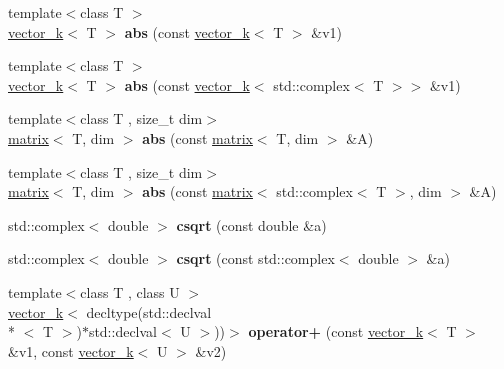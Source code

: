 \begin{DoxyCompactItemize}
\item 
\hypertarget{namespacekeycpp_a83cec179e95af014706ce54194efd1b9}{{\footnotesize template$<$class T $>$ }\\\hyperlink{classkeycpp_1_1vector__k}{vector\-\_\-k}$<$ T $>$ {\bfseries abs} (const \hyperlink{classkeycpp_1_1vector__k}{vector\-\_\-k}$<$ T $>$ \&v1)}\label{namespacekeycpp_a83cec179e95af014706ce54194efd1b9}

\item 
\hypertarget{namespacekeycpp_aa48f282087263edb46886e9390b9a833}{{\footnotesize template$<$class T $>$ }\\\hyperlink{classkeycpp_1_1vector__k}{vector\-\_\-k}$<$ T $>$ {\bfseries abs} (const \hyperlink{classkeycpp_1_1vector__k}{vector\-\_\-k}$<$ std\-::complex$<$ T $>$$>$ \&v1)}\label{namespacekeycpp_aa48f282087263edb46886e9390b9a833}

\item 
\hypertarget{namespacekeycpp_aeaeb417b7e61b4bbe200edc1315c7d2e}{{\footnotesize template$<$class T , size\-\_\-t dim$>$ }\\\hyperlink{classkeycpp_1_1matrix}{matrix}$<$ T, dim $>$ {\bfseries abs} (const \hyperlink{classkeycpp_1_1matrix}{matrix}$<$ T, dim $>$ \&A)}\label{namespacekeycpp_aeaeb417b7e61b4bbe200edc1315c7d2e}

\item 
\hypertarget{namespacekeycpp_a6f7d77410749bcf5a36793e3754e357b}{{\footnotesize template$<$class T , size\-\_\-t dim$>$ }\\\hyperlink{classkeycpp_1_1matrix}{matrix}$<$ T, dim $>$ {\bfseries abs} (const \hyperlink{classkeycpp_1_1matrix}{matrix}$<$ std\-::complex$<$ T $>$, dim $>$ \&A)}\label{namespacekeycpp_a6f7d77410749bcf5a36793e3754e357b}

\item 
\hypertarget{namespacekeycpp_a952e5296774667c3be4e792b5cd980da}{std\-::complex$<$ double $>$ {\bfseries csqrt} (const double \&a)}\label{namespacekeycpp_a952e5296774667c3be4e792b5cd980da}

\item 
\hypertarget{namespacekeycpp_a8faa7912f1f198c5185cb6a36cfd2fb2}{std\-::complex$<$ double $>$ {\bfseries csqrt} (const std\-::complex$<$ double $>$ \&a)}\label{namespacekeycpp_a8faa7912f1f198c5185cb6a36cfd2fb2}

\item 
\hypertarget{namespacekeycpp_aa865f0bd18bdefcf413b1c3dd286b998}{{\footnotesize template$<$class T , class U $>$ }\\\hyperlink{classkeycpp_1_1vector__k}{vector\-\_\-k}$<$ decltype(std\-::declval\\*
$<$ T $>$)$\ast$std\-::declval$<$ U $>$))$>$ {\bfseries operator+} (const \hyperlink{classkeycpp_1_1vector__k}{vector\-\_\-k}$<$ T $>$ \&v1, const \hyperlink{classkeycpp_1_1vector__k}{vector\-\_\-k}$<$ U $>$ \&v2)}\label{namespacekeycpp_aa865f0bd18bdefcf413b1c3dd286b998}


\end{DoxyCompactItemize}
